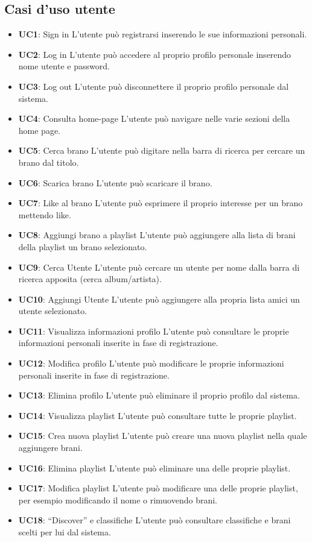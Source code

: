\subsection{Casi d'uso utente}
\begin{itemize}
    \item \textbf{UC1}: Sign in L'utente può registrarsi inserendo le sue informazioni
          personali.
    \item \textbf{UC2}: Log in L'utente può accedere al proprio profilo personale
          inserendo nome utente e password.
    \item \textbf{UC3}: Log out L'utente può disconnettere il proprio profilo personale
          dal sistema.
    \item \textbf{UC4}: Consulta home-page L'utente può navigare nelle varie sezioni
          della home page.
    \item \textbf{UC5}: Cerca brano L'utente può digitare nella barra di ricerca per
          cercare un brano dal titolo.
    \item \textbf{UC6}: Scarica brano L'utente può scaricare il brano.
    \item \textbf{UC7}: Like al brano L'utente può esprimere il proprio interesse per un
          brano mettendo like.
    \item \textbf{UC8}: Aggiungi brano a playlist L'utente può aggiungere alla lista di
          brani della playlist un brano selezionato.
    \item \textbf{UC9}: Cerca Utente L'utente può cercare un utente per nome dalla barra
          di ricerca apposita (cerca album/artista).
    \item \textbf{UC10}: Aggiungi Utente L'utente può aggiungere alla propria lista amici
          un utente selezionato.
    \item \textbf{UC11}: Visualizza informazioni profilo L'utente può consultare le
          proprie informazioni personali inserite in fase di registrazione.
    \item \textbf{UC12}: Modifica profilo L'utente può modificare le proprie informazioni
          personali inserite in fase di registrazione.
    \item \textbf{UC13}: Elimina profilo L'utente può eliminare il proprio profilo dal
          sistema.
    \item \textbf{UC14}: Visualizza playlist L'utente può consultare tutte le proprie
          playlist.
    \item \textbf{UC15}: Crea nuova playlist L'utente può creare una nuova playlist nella
          quale aggiungere brani.
    \item \textbf{UC16}: Elimina playlist L'utente può eliminare una delle proprie
          playlist.
    \item \textbf{UC17}: Modifica playlist L'utente può modificare una delle proprie
          playlist, per esempio modificando il nome o rimuovendo brani.
    \item \textbf{UC18}: “Discover” e classifiche L'utente può consultare classifiche e
          brani scelti per lui dal sistema.

\end{itemize}

